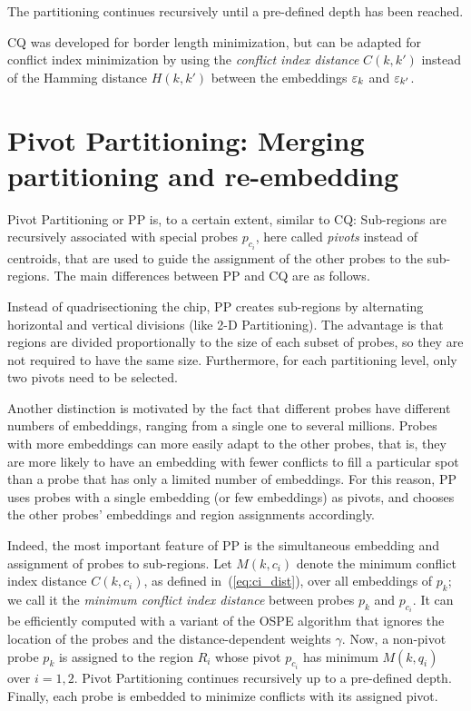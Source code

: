 The partitioning continues recursively until a pre-defined depth has been
reached.

CQ was developed for border length minimization, but can be adapted
for conflict index minimization by using the \emph{conflict index
  distance} $C(k,k')$ instead of the Hamming distance $H(k,k')$
between the embeddings $\varepsilon_k$ and $\varepsilon_{k'}$.

\section{Pivot Partitioning: Merging partitioning and re-embedding}
\label{sec:part_pp}

Pivot Partitioning or PP \citep{Carvalho2006} is, to a certain extent,
similar to CQ: Sub-regions are recursively associated with special
probes $p_{c_i}$, here called \emph{pivots} instead of centroids, that
are used to guide the assignment of the other probes to the
sub-regions.  The main differences between PP and CQ are as follows.

Instead of quadrisectioning the chip, PP creates sub-regions by
alternating horizontal and vertical divisions (like 2-D Partitioning).
The advantage is that regions are divided proportionally to the size
of each subset of probes, so they are not required to have the same
size. Furthermore, for each partitioning level, only two pivots need
to be selected.

Another distinction is motivated by the fact that different probes
have different numbers of embeddings, ranging from a single one to
several millions.  Probes with more embeddings can more easily adapt
to the other probes, that is, they are more likely to have an
embedding with fewer conflicts to fill a particular spot than a probe
that has only a limited number of embeddings. For this reason, PP uses
probes with a single embedding (or few embeddings) as pivots, and
chooses the other probes' embeddings and region assignments accordingly.

Indeed, the most important feature of PP is the simultaneous embedding and
assignment of probes to sub-regions. Let $M(k,c_i)$ denote the minimum
conflict index distance $C(k,c_i)$, as defined in~(\ref{eq:ci_dist}), over all
embeddings of $p_k$; we call it the \emph{minimum conflict index distance}
between probes $p_k$ and $p_{c_i}$. It can be efficiently computed with a
variant of the OSPE algorithm that ignores the location of the probes and the
distance-dependent weights $\gamma$. Now, a non-pivot probe $p_k$ is assigned
to the region $R_i$ whose pivot $p_{c_i}$ has minimum $M(k,q_i)$ over $i=1,2$.
Pivot Partitioning continues recursively up to a pre-defined depth. Finally,
each probe is embedded to minimize conflicts with its assigned pivot.
